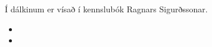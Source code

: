 \documentclass[a4paper,10pt,icelandic]{sphinxmanual}
\begin{document}
Í dálkinum  er vísað
í kennslubók Ragnars Sigurðssonar.
\begin{itemize}
\item {} 

\item {} 

\end{itemize}



\renewcommand{\indexname}{Atriðaskrá}
\printindex
\end{document}
